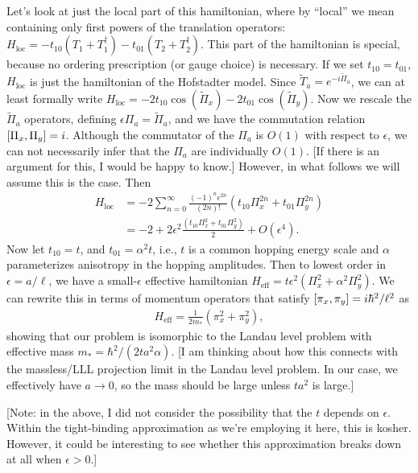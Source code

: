 \documentclass[aps,prb,twocolumn,letterpaper,twoside,nobalancelastpage,groupedaddress,amsmath,amssymb,floatfix,citeautoscript]{revtex4-1}
\begin{document}
Let's look at just the local part of this hamiltonian, where by ``local'' we mean containing only first powers of the translation operators: $H_{\text{loc}} = -t_{10}\left(T_1 + T_1^{\dag}\right) - t_{01}\left(T_2 + T_2^{\dag}\right)$. This part of the hamiltonian is special, because no ordering prescription (or gauge choice) is necessary.   If we set $t_{10} = t_{01}$, $H_{\text{loc}}$ is just the hamiltonian of the Hofstadter model. Since $\widetilde{T}_a = e^{-i\widetilde{\Pi}_a}$, we can at least formally write $H_{\text{loc}}= -2t_{10}\cos\left(\widetilde{\Pi}_x\right) - 2 t_{01}\cos\left(\widetilde{\Pi}_y\right).$ Now we rescale the $\widetilde{\Pi}_a$ operators, defining $\epsilon\Pi_a = \widetilde{\Pi}_a$, and we have the commutation relation $\comm{\Pi_x}{\Pi_y} = i$. Although the commutator of the $\Pi_a$ is $O(1)$ with respect to $\epsilon$, we can not necessarily infer that the $\Pi_a$ are individually $O(1)$. [If there is an argument for this, I would be happy to know.] However, in what follows we will assume this is the case. Then
\begin{align*}
H_{\text{loc}} &= -2\sum_{n=0}^{\infty}  \frac{(-1)^{n}\epsilon^{2n}}{(2n)!} \left(t_{10}\Pi^{2n}_x + t_{01} \Pi^{2n}_y\right)\\
&= -2 + 2\epsilon^2\frac{\left(t_{10}\Pi^{2}_x + t_{01}\Pi^{2}_y\right)}{2} +O(\epsilon^4).
\end{align*}
Now let $t_{10} = t$, and $t_{01} = \alpha^2 t$, i.e., $t$ is a common hopping energy scale and $\alpha$ parameterizes anisotropy in the hopping amplitudes. Then to lowest order in $\epsilon = a/\ell$, we have a small-$\epsilon$ effective hamiltonian $H_{\text{eff}}= t\epsilon^2 \left(\Pi^{2}_x + \alpha^2\Pi^{2}_y\right)$. We can rewrite this in terms of momentum operators that satisfy $\comm{\pi_x}{\pi_y} = i\hbar^2/\ell^2$ as
\begin{align*}
H_{\text{eff}} = \frac{1}{2m_{\ast}}\left(\pi_x^2 + \pi_y^2\right),
\end{align*}
showing that our problem is isomorphic to the Landau level problem with effective mass $m_{\ast} = \hbar^2/(2ta^2\alpha)$. [I am thinking about how this connects with the massless/LLL projection limit in the Landau level problem. In our case, we effectively have $a\rightarrow0$, so the mass should be large unless $ta^2$ is large.]

[Note: in the above, I did not consider the possibility that the $t$ depends on $\epsilon$. Within the tight-binding approximation as we're employing it here, this is kosher. However, it could be interesting to see whether this approximation breaks down at all when $\epsilon>0$.]
\end{document}
